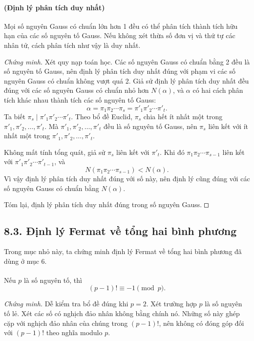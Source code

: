 \documentclass[11pt]{article}
\newcommand{\square}{\mathord{\vcenter{\hrule height .5pt
  \hbox{\vrule width .5pt height 5pt\kern5pt\vrule width .5pt}
  \hrule height .5pt}}}
\begin{document}
\paragraph{ (Định lý phân tích duy nhất)}
Mọi số nguyên Gauss có chuẩn lớn hơn 1 đều có thể phân tích thành tích hữu hạn
của các số nguyên tố Gauss. Nếu không xét thừa số đơn vị và thứ tự các nhân
tử, cách phân tích như vậy là duy nhất.

\emph{Chứng minh.}
Xét quy nạp toán học. Các số nguyên Gauss có chuẩn bằng 2 đều là số nguyên tố
Gauss, nên định lý phân tích duy nhất đúng với phạm vi các số nguyên Gauss có
chuẩn không vượt quá 2. Giả sử định lý phân tích duy nhất đều đúng với các số
nguyên Gauss có chuẩn nhỏ hơn \(N(\alpha)\), và \(\alpha\) có hai cách phân
tích khác nhau thành tích các số nguyên tố Gauss:
\[
  \alpha=\pi_1\pi_2\cdots\pi_s=\pi'_1\pi'_2\cdots\pi'_t.
\]
Ta biết \(\pi_s\mid\pi'_1\pi'_2\cdots\pi'_t\). Theo bổ đề Euclid, \(\pi_s\)
chia hết ít nhất một trong \(\pi'_1,\pi'_2,\ldots,\pi'_t\). Mà
\(\pi'_1,\pi'_2,\ldots,\pi'_t\) đều là số nguyên tố Gauss, nên \(\pi_s\) liên
kết với ít nhất một trong \(\pi'_1,\pi'_2,\ldots,\pi'_t\).

Không mất tính tổng quát, giả sử \(\pi_s\) liên kết với \(\pi'_t\). Khi đó
\(\pi_1\pi_2\cdots\pi_{s-1}\) liên kết với
\(\pi'_1\pi'_2\cdots\pi'_{t-1}\), và
\[
  N(\pi_1\pi_2\cdots\pi_{s-1})<N(\alpha).
\]
Vì vậy định lý phân tích duy nhất đúng với số này, nên định lý cũng đúng với
các số nguyên Gauss có chuẩn bằng \(N(\alpha)\).

Tóm lại, định lý phân tích duy nhất đúng trong số nguyên Gauss. \(\square\)

\subsection*{8.3. Định lý Fermat về tổng hai bình phương}

Trong mục nhỏ này, ta chứng minh định lý Fermat về tổng hai bình phương đã
dùng ở mục 6.

\paragraph{}
Nếu \(p\) là số nguyên tố, thì
\[
  (p-1)!\equiv -1\pmod p.
\]

\emph{Chứng minh.}
Dễ kiểm tra bổ đề đúng khi \(p=2\). Xét trường hợp \(p\) là số nguyên tố lẻ.
Xét các số có nghịch đảo nhân không bằng chính nó. Những số này ghép cặp với
nghịch đảo nhân của chúng trong \((p-1)!\), nên không có đóng góp đối với
\((p-1)!\) theo nghĩa modulo \(p\).
\end{document}
